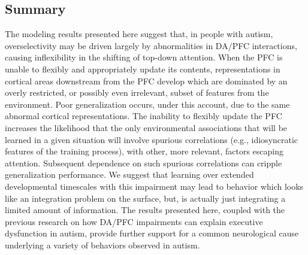 \subsection{Summary}
The modeling results presented here suggest that, in people with autism, overselectivity may be driven largely by abnormalities in DA/PFC interactions, causing inflexibility in the shifting of top-down attention.  When the PFC is unable to flexibly and appropriately update its contents, representations in cortical areas downstream from the PFC develop which are dominated by an overly restricted, or possibly even irrelevant, subset of features from the environment.  Poor generalization occurs, under this account, due to the same abnormal cortical representations.  The inability to flexibly update the PFC increases the likelihood that the only environmental associations that will be learned in a given situation will involve spurious correlations (e.g., idiosyncratic features of the training process), with other, more relevant, factors escaping attention.  Subsequent dependence on such spurious correlations can cripple generalization performance.  We suggest that learning over extended developmental timescales with this impairment may lead to behavior which looks like an integration problem on the surface, but, is actually just integrating a limited amount of information.  The results presented here, coupled with the previous research on how DA/PFC impairments can explain executive dysfunction in autism, provide further support for a common neurological cause underlying a variety of behaviors observed in autism.   

